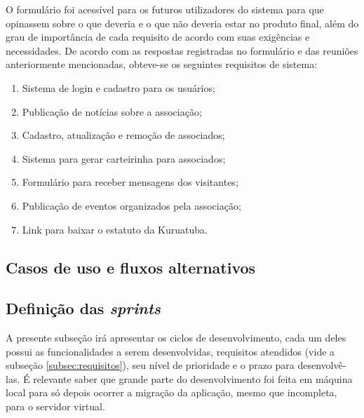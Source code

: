 O formulário foi acessível para os futuros utilizadores do sistema para que opinassem sobre o que deveria e o que não deveria estar no produto final, além do grau de importância de cada requisito de acordo com suas exigências e necessidades. De acordo com as respostas registradas no formulário e das reuniões anteriormente mencionadas, obteve-se os seguintes requisitos de sistema:

\begin{enumerate}
 \item Sistema de login e cadastro para os usuários;
 \item Publicação de notícias sobre a associação;
 \item Cadastro, atualização e remoção de associados;
 \item Sistema para gerar carteirinha para associados;
 \item Formulário para receber mensagens dos visitantes;
 \item Publicação de eventos organizados pela associação;
 \item Link para baixar o estatuto da Kuruatuba.
\end{enumerate}



\hspace{2.5cm}
\subsection{Casos de uso e fluxos alternativos}
\label{subsec:usecase}
\hspace{2.5cm}

\hspace{2.5cm}
\subsection{Definição das \textit{sprints}}
\label{subsec:sprints}
\hspace{2.5cm}

A presente subseção irá apresentar os ciclos de desenvolvimento, cada um deles possui as funcionalidades a serem desenvolvidas, requisitos atendidos (vide a subseção \ref{subsec:requisitos}), seu nível de prioridade e o prazo para desenvolvê-las. É relevante saber que grande parte do desenvolvimento foi feita em máquina local para só depois ocorrer a migração da aplicação, mesmo que incompleta, para o servidor virtual.


